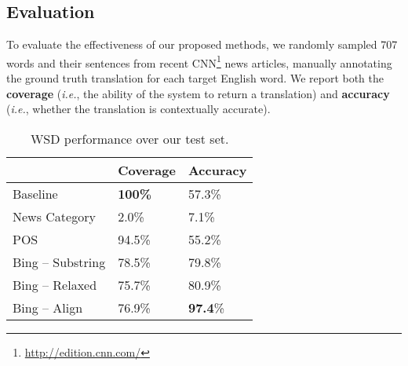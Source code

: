 \begin{CJK}{UTF8}{gbsn}


\subsection{Evaluation}
To evaluate the effectiveness of our proposed methods, we randomly
sampled 707 words and their sentences from recent
CNN\footnote{\url{http://edition.cnn.com/}} news articles, manually
annotating the ground truth translation for each target English
word. We report both the {\bf coverage} ({\it i.e.}, the ability of
the system to return a translation) and {\bf accuracy} ({\it i.e.},
whether the translation is contextually accurate).

\begin{table}[t]
\centering
  \caption{WSD performance over our test set.}
  \label{table:evaluation_1}
  \begin{tabular}{| p{2.7cm} | p{1.7cm} | p{1.7cm} |}
    \hline
     & {\bf Coverage} & {\bf Accuracy}\\
    \hline
    Baseline & {\bf 100\%} & 57.3\%\\
    \hline
    News Category & 2.0\% & 7.1\%\\
    \hline
    POS & 94.5\% & 55.2\%\\
    \hline
    Bing -- Substring & 78.5\% & 79.8\%\\
    \hline
    Bing -- Relaxed  & 75.7\% & 80.9\%\\
    \hline
    Bing -- Align & 76.9\% & {\bf 97.4}\%\\
    \hline
  \end{tabular}
\end{table}


\end{CJK}
